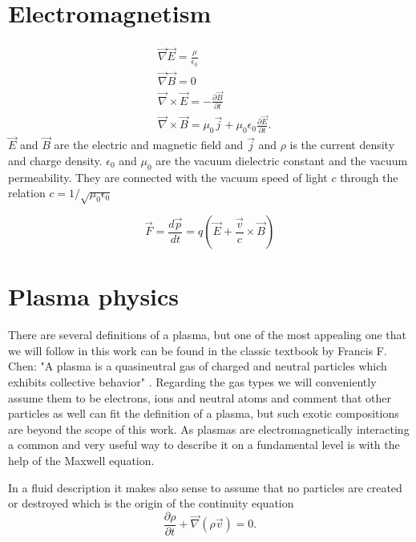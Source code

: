 \section{Electromagnetism}

\begin{align}
\label{eqn:Maxwell}
&\vec{\nabla} \vec{E} = \frac{\rho}{\epsilon_0}\\	
&\vec{\nabla}\vec{B} =0\\
	&\vec{\nabla}\times\vec{E}=-\frac{\partial \vec{B}}{\partial t}\\
 &\vec{\nabla}\times \vec{B}=\mu_0\vec{j}+\mu_0\epsilon_0\frac{\partial \vec{E}}{\partial t}.
\end{align}
$\vec{E}$ and $\vec{B}$ are the electric and magnetic field and  $\vec{j}$ and $\rho$ is the current density and charge density.
$\epsilon_0$ and $\mu_0$ are the vacuum  dielectric constant and the vacuum permeability. They are connected with the vacuum speed of light $c$ through the relation $c=1/\sqrt{\mu_0 \epsilon_0}$


\begin{equation}
\vec{F}=\frac{d\vec{p}}{dt}=q(\vec{E}+\frac{\vec{v}}{c}\times\vec{B})
\label{eqn:Lorentz}
\end{equation}

\section{Plasma physics}
There are several definitions of a plasma, but one of the most appealing one that we will follow in this work can be found in the classic 
textbook by Francis F. Chen:
"A plasma is a quasineutral gas of charged and neutral particles which
exhibits collective behavior" \cite{Chen_book_Plasma}.
Regarding the gas types we will conveniently assume them to be electrons, ions and neutral atoms and comment that other particles as well can fit the definition of a plasma, but such exotic compositions are beyond the scope of this work.
As plasmas are electromagnetically interacting a common and very useful way to describe it on a fundamental level is with the help of the Maxwell equation.

In a fluid description it makes also sense to assume that no particles are created or destroyed which is the origin of the 
continuity equation 
\begin{equation}
\frac{\partial \rho}{\partial t} + \vec{\nabla}(\rho \vec{v})=0.
\end{equation}




